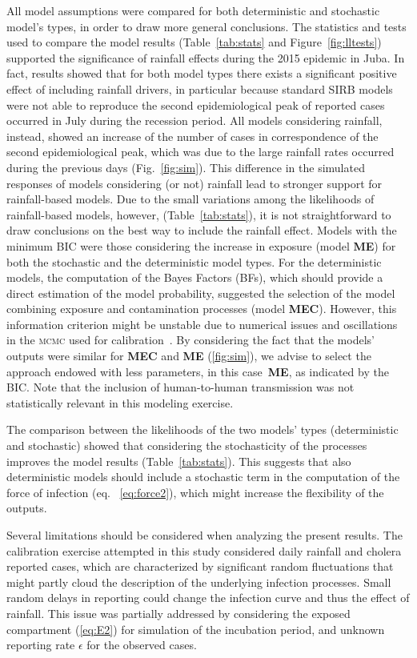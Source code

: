 All model assumptions were compared for both deterministic and stochastic model's types, in order to draw more general conclusions. The statistics and tests used to compare the model results  (Table~\ref{tab:stats} and Figure~\ref{fig:lltests}) supported the significance of rainfall effects during the 2015 epidemic in Juba. In fact, results showed that for both model types there exists a significant positive effect of including rainfall drivers, in particular because standard SIRB models were not able to reproduce the second epidemiological peak of reported cases occurred in July during the recession period. All models considering rainfall, instead, showed an increase of the number of cases in correspondence of the second epidemiological peak, which was due to the large rainfall rates occurred during the previous days (Fig.~\ref{fig:sim}). 
This difference in the simulated responses of models considering (or not) rainfall lead to stronger support for rainfall-based models. Due to the small variations among the likelihoods of rainfall-based models, however,  (Table~\ref{tab:stats}), it is not straightforward to draw conclusions on the best way to include the rainfall effect.
Models with the minimum BIC were those considering the increase in exposure (model \textbf{ME}) for both the stochastic and the deterministic model types. For the deterministic models, the computation of the Bayes Factors (BFs), which should provide a direct estimation of the model probability, suggested the selection of the model combining exposure and contamination processes (model \textbf{MEC}). However, this information criterion might be unstable due to numerical issues and oscillations in the \textsc{mcmc} used for calibration~\cite{Raftery07}. By considering the fact that the models' outputs were similar for \textbf{MEC} and \textbf{ME} (\ref{fig:sim}), we advise to select the approach endowed with less parameters, in this case~\textbf{ME}, as indicated by the BIC. Note that the inclusion of human-to-human transmission was not statistically relevant in this modeling exercise.

The comparison between the likelihoods of the two models' types (deterministic and stochastic) showed that considering the stochasticity of the processes improves the model results (Table~\ref{tab:stats}). This suggests that also deterministic models should include a stochastic term in the computation of the force of infection (eq. ~\ref{eq:force2}), which might increase the flexibility of the outputs.

Several limitations should be considered when analyzing the present results. The calibration exercise attempted in this study considered daily rainfall and cholera reported cases, which are characterized by significant random fluctuations that might partly cloud the description of the underlying infection processes. 
Small random delays in reporting could change the infection curve and thus the effect of rainfall. This issue was partially addressed by considering the exposed compartment (\ref{eq:E2}) for simulation of the incubation period, and unknown reporting rate $\epsilon$ for the observed cases.

